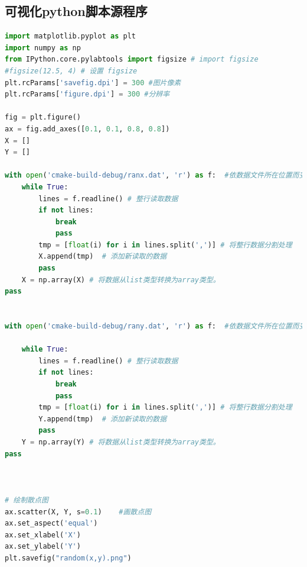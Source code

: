 \documentclass[a4paper,11pt]{article}
\begin{document}
\begin{appendices}
\newpage
\section{可视化python脚本源程序}
\begin{lstlisting}[language = python]
import matplotlib.pyplot as plt
import numpy as np
from IPython.core.pylabtools import figsize # import figsize
#figsize(12.5, 4) # 设置 figsize
plt.rcParams['savefig.dpi'] = 300 #图片像素
plt.rcParams['figure.dpi'] = 300 #分辨率

fig = plt.figure()
ax = fig.add_axes([0.1, 0.1, 0.8, 0.8])
X = []
Y = []

with open('cmake-build-debug/ranx.dat', 'r') as f:  #依数据文件所在位置而变
    while True:
        lines = f.readline() # 整行读取数据
        if not lines:
            break
            pass
        tmp = [float(i) for i in lines.split(',')] # 将整行数据分割处理        
        X.append(tmp)  # 添加新读取的数据
        pass
    X = np.array(X) # 将数据从list类型转换为array类型。
pass

    
with open('cmake-build-debug/rany.dat', 'r') as f:  #依数据文件所在位置而变

    while True:
        lines = f.readline() # 整行读取数据
        if not lines:
            break
            pass
        tmp = [float(i) for i in lines.split(',')] # 将整行数据分割处理        
        Y.append(tmp)  # 添加新读取的数据
        pass
    Y = np.array(Y) # 将数据从list类型转换为array类型。
pass
    
    
    
# 绘制散点图
ax.scatter(X, Y, s=0.1)    #画散点图
ax.set_aspect('equal')
ax.set_xlabel('X')
ax.set_ylabel('Y')
plt.savefig("random(x,y).png")

\end{lstlisting}

\end{appendices}
\end{document}

